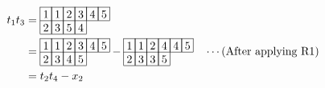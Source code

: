 \begin{align*}
t_1t_3 &= 
\begin{array}[c]{*{6}c}\cline{1-6}
\lr{1}&\lr{1}&\lr{2}&\lr{3}&\lr{4}&\lr{5}\\\cline{1-6}
\lr{2}&\lr{3}&\lr{5}&\lr{4}\\\cline{1-4}
\end{array}\\
&=
\begin{array}[c]{*{6}c}\cline{1-6}
\lr{1}&\lr{1}&\lr{2}&\lr{3}&\lr{4}&\lr{5}\\\cline{1-6}
\lr{2}&\lr{3}&\lr{4}&\lr{5}\\\cline{1-4}
\end{array}
-\begin{array}[c]{*{6}c}\cline{1-6}
\lr{1}&\lr{1}&\lr{2}&\lr{4}&\lr{4}&\lr{5}\\\cline{1-6}
\lr{2}&\lr{3}&\lr{3}&\lr{5}\\\cline{1-4}
\end{array}
&& \cdots (\text{After applying R1})\\
&=t_2t_4-x_2
\end{align*}
